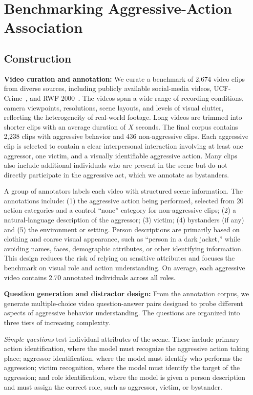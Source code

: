 \section{Benchmarking Aggressive-Action Association}
\subsection{Construction}
\textbf{Video curation and annotation:}
We curate a benchmark of 2,674 video clips from diverse sources, including publicly available social-media videos, UCF-Crime~\cite{ucfcrimes}, and RWF-2000~\cite{rwf}. The videos span a wide range of recording conditions, camera viewpoints, resolutions, scene layouts, and levels of visual clutter, reflecting the heterogeneity of real-world footage. Long videos are trimmed into shorter clips with an average duration of $X$ seconds. The final corpus contains 2,238 clips with aggressive behavior and 436 non-aggressive clips. Each aggressive clip is selected to contain a clear interpersonal interaction involving at least one aggressor, one victim, and a visually identifiable aggressive action. Many clips also include additional individuals who are present in the scene but do not directly participate in the aggressive act, which we annotate as bystanders.

A group of annotators labels each video with structured scene information. The annotations include: (1) the aggressive action being performed, selected from 20 action categories and a control ``none'' category for non-aggressive clips; (2) a natural-language description of the aggressor; (3) victim; (4) bystanders (if any) and (5) the environment or setting. Person descriptions are primarily based on clothing and coarse visual appearance, such as ``person in a dark jacket,'' while avoiding names, faces, demographic attributes, or other identifying information. This design reduces the risk of relying on sensitive attributes and focuses the benchmark on visual role and action understanding. On average, each aggressive video contains 2.70 annotated individuals across all roles.

\textbf{Question generation and distractor design:}
From the annotation corpus, we generate multiple-choice video question-answer pairs designed to probe different aspects of aggressive behavior understanding. The questions are organized into three tiers of increasing complexity.

\textit{Simple questions} test individual attributes of the scene. These include primary action identification, where the model must recognize the aggressive action taking place; aggressor identification, where the model must identify who performs the aggression; victim recognition, where the model must identify the target of the aggression; and role identification, where the model is given a person description and must assign the correct role, such as aggressor, victim, or bystander.

